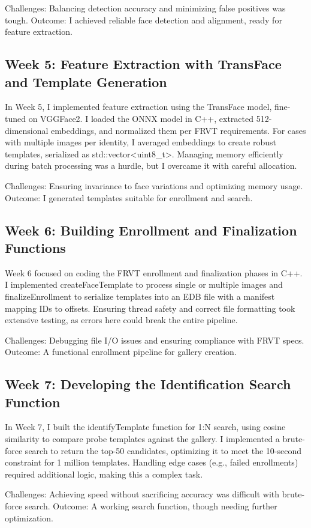 \documentclass[conference]{IEEEtran}
\begin{document}
Challenges: Balancing detection accuracy and minimizing false positives was tough. Outcome: I achieved reliable face detection and alignment, ready for feature extraction.

\subsection{Week 5: Feature Extraction with TransFace and Template Generation}
In Week 5, I implemented feature extraction using the TransFace model, fine-tuned on VGGFace2. I loaded the ONNX model in C++, extracted 512-dimensional embeddings, and normalized them per FRVT requirements. For cases with multiple images per identity, I averaged embeddings to create robust templates, serialized as std::vector<uint8_t>. Managing memory efficiently during batch processing was a hurdle, but I overcame it with careful allocation.

Challenges: Ensuring invariance to face variations and optimizing memory usage. Outcome: I generated templates suitable for enrollment and search.
\subsection{Week 6: Building Enrollment and Finalization Functions}
Week 6 focused on coding the FRVT enrollment and finalization phases in C++. I implemented createFaceTemplate to process single or multiple images and finalizeEnrollment to serialize templates into an EDB file with a manifest mapping IDs to offsets. Ensuring thread safety and correct file formatting took extensive testing, as errors here could break the entire pipeline.

Challenges: Debugging file I/O issues and ensuring compliance with FRVT specs. Outcome: A functional enrollment pipeline for gallery creation.

\subsection{Week 7: Developing the Identification Search Function}
In Week 7, I built the identifyTemplate function for 1:N search, using cosine similarity to compare probe templates against the gallery. I implemented a brute-force search to return the top-50 candidates, optimizing it to meet the 10-second constraint for 1 million templates. Handling edge cases (e.g., failed enrollments) required additional logic, making this a complex task.

Challenges: Achieving speed without sacrificing accuracy was difficult with brute-force search. Outcome: A working search function, though needing further optimization.
\end{document}
